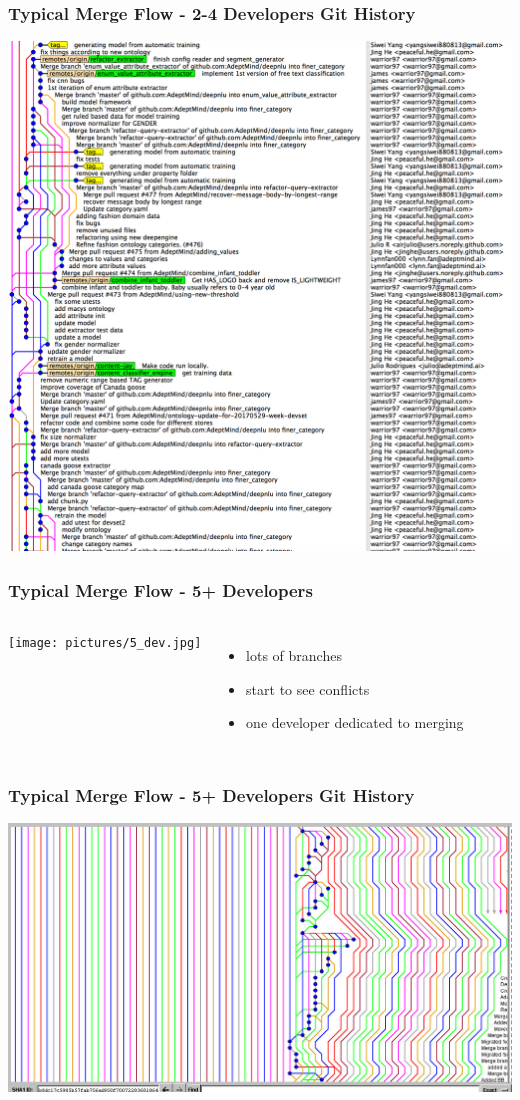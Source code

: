 \documentclass{beamer}
\begin{document}
\begin{frame}
    \frametitle{Typical Merge Flow - 2-4 Developers Git History}
    \includegraphics[scale=0.15]{pictures/more_solo_git.png}    
\end{frame}

\begin{frame}
\frametitle{Typical Merge Flow - 5+ Developers}

\begin{columns}
        \texttt{[image: pictures/5\_dev.jpg]}
        \begin{itemize}
            \item lots of branches
            \item start to see conflicts
            \item one developer dedicated to merging
    \end{itemize}
\end{columns}
\end{frame}

\begin{frame}
\frametitle{Typical Merge Flow - 5+ Developers Git History}
    \begin{center}
        \includegraphics[scale=0.25]{pictures/no.jpg}    
    \end{center}
\end{frame}
\end{document}

